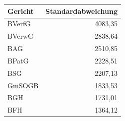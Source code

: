 \begin{tabular}{lr}
\toprule
Gericht &  Standardabweichung \\
\midrule
 BVerfG &         4083,35 \\
 BVerwG &         2838,64 \\
    BAG &         2510,85 \\
  BPatG &         2228,51 \\
    BSG &         2207,13 \\
 GmSOGB &         1833,53 \\
    BGH &         1731,01 \\
    BFH &         1364,12 \\
\bottomrule
\end{tabular}
